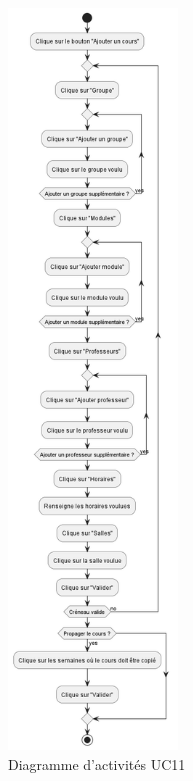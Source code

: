 \documentclass[12pt,a4paper]{article}
\begin{document}
\begin{figure}[h]
    \centering
    \includegraphics[width=0.4\textwidth]{Diag_activites_UC11.png}
    \caption{Diagramme d'activités UC11}
    \label{fig:act_011}
\end{figure}
\end{document}
